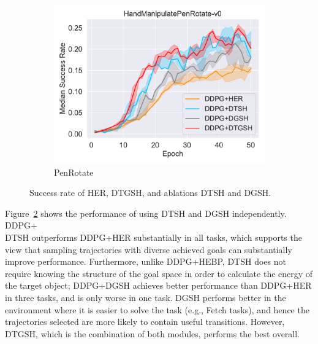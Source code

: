 \begin{figure}[h!]
\begin{subfigure}[t]{0.49\textwidth}
    \includegraphics[width=\textwidth]{figures/chapter4/HandManipulatePenRotate-v0_ab1.pdf}
    \caption{PenRotate}
    \label{subfig:baseline_handpen_ab1}
  \end{subfigure}\hfill
  \caption{Success rate of HER, DTGSH, and ablations DTSH and DGSH.  } 
  \label{fig:ablation1}
\end{figure}

Figure~\ref{fig:ablation1} shows the performance of using DTSH and DGSH independently. DDPG+\\DTSH outperforms DDPG+HER substantially in all tasks, which supports the view that sampling trajectories with diverse achieved goals can substantially improve performance. Furthermore, unlike DDPG+HEBP, DTSH does not require knowing the structure of the goal space in order to calculate the energy of the target object; DDPG+DGSH achieves better performance than DDPG+HER in three tasks, and is only worse in one task. DGSH performs better in the environment where it is easier to solve the task (e.g., Fetch tasks), and hence the trajectories selected are more likely to contain useful transitions. However, DTGSH, which is the combination of both modules, performs the best overall.

